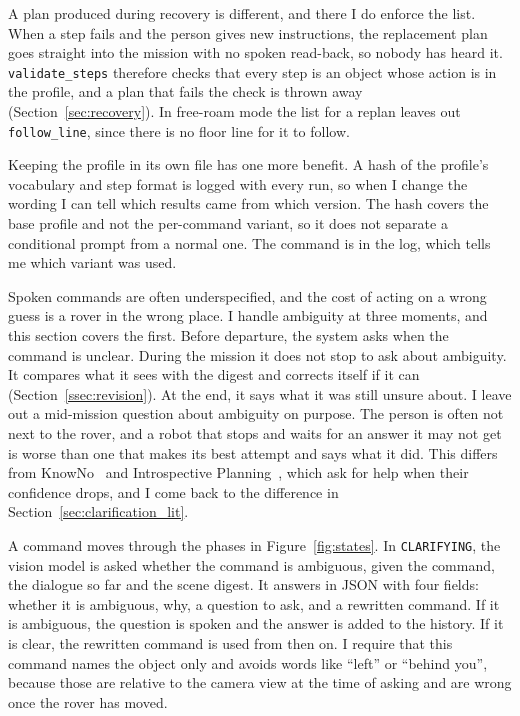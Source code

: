 A plan produced during recovery is different, and there I do enforce the list.
When a step fails and the person gives new instructions, the replacement plan
goes straight into the mission with no spoken read-back, so nobody has heard it.
\texttt{validate\_steps} therefore checks that every step is an object whose
action is in the profile, and a plan that fails the check is thrown away
(Section~\ref{sec:recovery}). In free-roam mode the list for a replan leaves out
\texttt{follow\_line}, since there is no floor line for it to follow.

Keeping the profile in its own file has one more benefit. A hash of the profile's
vocabulary and step format is logged with every run, so when I change the wording
I can tell which results came from which version. The hash covers the base
profile and not the per-command variant, so it does not separate a conditional
prompt from a normal one. The command is in the log, which tells me which variant
was used. %

\label{sec:clarification_design}


Spoken commands are often underspecified, and the cost of acting on a wrong guess
is a rover in the wrong place. I handle ambiguity at three moments, and this
section covers the first. Before departure, the system asks when the command is
unclear. During the mission it does not stop to ask about ambiguity. It compares
what it sees with the digest and corrects itself if it can
(Section~\ref{ssec:revision}). At the end, it says what it was still unsure
about. I leave out a mid-mission question about ambiguity on purpose. The person
is often not next to the rover, and a robot that stops and waits for an answer it
may not get is worse than one that makes its best attempt and says what it did.
This differs from KnowNo~\cite{ren2023knowno} and Introspective
Planning~\cite{liang2024introspective}, which ask for help when their confidence
drops, and I come back to the difference in Section~\ref{sec:clarification_lit}.

\label{ssec:statemachine}

A command moves through the phases in Figure~\ref{fig:states}. In
\texttt{CLARIFYING}, the vision model is asked whether the command is ambiguous,
given the command, the dialogue so far and the scene digest. It answers in JSON
with four fields: whether it is ambiguous, why, a question to ask, and a rewritten
command. If it is ambiguous, the question is spoken and the answer is added to the
history. If it is clear, the rewritten command is used from then on. I require
that this command names the object only and avoids words like ``left'' or
``behind you'', because those are relative to the camera view at the time of
asking and are wrong once the rover has moved.

